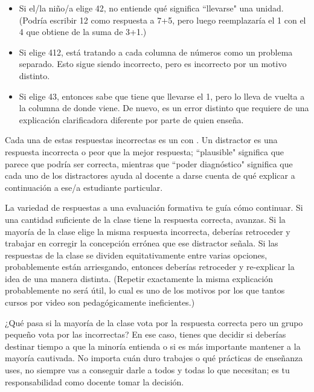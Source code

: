 \begin{itemize}

\item
  Si el/la niño/a elige 42,
no entiende qué significa ``llevarse" una unidad.
(Podría escribir 12 como respuesta a 7+5,
pero luego reemplazaría el 1 con el 4 que obtiene de la suma de 3+1.)
\item
 Si elige 412,
está tratando a cada columna de números como un problema separado.
Esto sigue siendo incorrecto,
pero es incorrecto por un motivo distinto.

\item
Si elige 43, entonces sabe que tiene que llevarse el 1,
pero lo lleva de vuelta a la columna de donde viene.
De nuevo,
es un error distinto
que requiere de una explicación clarificadora diferente por parte de quien enseña.  
\end{itemize}

Cada una de estas respuestas incorrectas es un 
con .
Un distractor es una respuesta incorrecta o peor que la mejor respuesta;
``plausible" significa que parece que podría ser correcta,
mientras que ``poder diagnóstico" significa que cada uno de los distractores ayuda al docente a darse cuenta de qué explicar a continuación a ese/a estudiante particular.

La variedad de respuestas a una evaluación formativa te guía cómo continuar.
Si una cantidad suficiente de la clase tiene la respuesta correcta, avanzas.
Si la mayoría de la clase elige la misma respuesta incorrecta,
deberías retroceder y trabajar en corregir la concepción errónea que ese distractor señala.
Si las respuestas de la clase se dividen equitativamente entre varias opciones, probablemente están arriesgando, entonces deberías retroceder y re-explicar la idea de una manera distinta.
(Repetir exactamente la misma explicación probablemente no será útil,
lo cual es uno de los motivos por los que tantos cursos por video son pedagógicamente ineficientes.)

¿Qué pasa si la mayoría de la clase vota por la respuesta correcta
pero un grupo pequeño vota por las incorrectas?
En ese caso, 
tienes que decidir si deberías destinar tiempo a que la minoría entienda
o si es más importante mantener a la mayoría cautivada.
No importa cuán duro trabajes o qué prácticas de enseñanza uses,
no siempre vas a conseguir darle a todos y todas lo que necesitan;
es tu responsabilidad como docente tomar la decisión.

